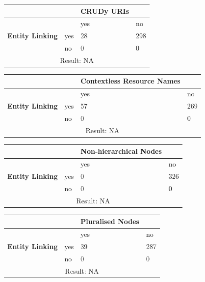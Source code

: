 \documentclass[a4paper,12pt]{article}
\begin{document}
\begin{center}
  \begin{tabular}{| p{60mm} | p{10mm} | p{35mm} | p{35mm} |}
  \hline
   & & \textbf{CRUDy URIs} &
  \\
  \hline
  & & yes & no
  \\
  \hline
  \textbf{Entity Linking} & yes & 28 & 298
  \\
  \hline
   & no & 0 & 0
  \\
  \hline
  \multicolumn{4}{|c|}{Result: NA}
  \\ \hline
  \end{tabular}
  \end{center}

\begin{center}
  \begin{tabular}{| p{60mm} | p{10mm} | p{35mm} | p{35mm} |}
  \hline
   & & \textbf{Contextless Resource Names} &
  \\
  \hline
  & & yes & no
  \\
  \hline
  \textbf{Entity Linking} & yes & 57 & 269
  \\
  \hline
   & no & 0 & 0
  \\
  \hline
  \multicolumn{4}{|c|}{Result: NA}
  \\ \hline
  \end{tabular}
  \end{center}

\begin{center}
  \begin{tabular}{| p{60mm} | p{10mm} | p{35mm} | p{35mm} |}
  \hline
   & & \textbf{Non-hierarchical Nodes} &
  \\
  \hline
  & & yes & no
  \\
  \hline
  \textbf{Entity Linking} & yes & 0 & 326
  \\
  \hline
   & no & 0 & 0
  \\
  \hline
  \multicolumn{4}{|c|}{Result: NA}
  \\ \hline
  \end{tabular}
  \end{center}

\begin{center}
  \begin{tabular}{| p{60mm} | p{10mm} | p{35mm} | p{35mm} |}
  \hline
   & & \textbf{Pluralised Nodes} &
  \\
  \hline
  & & yes & no
  \\
  \hline
  \textbf{Entity Linking} & yes & 39 & 287
  \\
  \hline
   & no & 0 & 0
  \\
  \hline
  \multicolumn{4}{|c|}{Result: NA}
  \\ \hline
  \end{tabular}
  \end{center}
\end{document}

